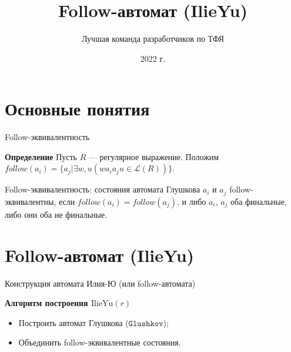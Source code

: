 \documentclass[mathserif]{beamer}
\title[] {Follow-автомат (IlieYu)}
\author[Chipollino]{Лучшая команда разработчиков по ТФЯ} %
\date[] 
{2022 г.}
\newcommand{\Lang}{\mathscr{L}} %
\def\IlieYu{\mathrm{IlieYu}}
\def\Glushkov{\mathtt{Glushkov}}
\begin{document}
\maketitle
\section{Основные понятия}
\begin{frame}{Follow-эквивалентность}
  \begin{block}{\bf Определение}
    Пусть $R$ --- регулярное выражение. Положим $follow(a_{i}) = \{a_{j} | \exists w, u(wa_{i}a_{j}u \in\Lang(R))\}$.

    Follow-эквивалентность: состояния автомата Глушкова $a_{i}$ и $a_{j}$ follow-эквивалентны, если $follow(a_{i}) = follow(a_{j})$, и либо $a_{i}$, $a_{j}$ оба финальные, либо они оба не финальные.
  \end{block} %
\end{frame}

\section{Follow-автомат (IlieYu)}
\begin{frame}{Конструкция автомата Илия-Ю (или follow-автомата)}
  \begin{block}{\bf Алгоритм построения $\IlieYu(r)$}
    \begin{itemize}
      \item Построить автомат Глушкова ($\Glushkov$);
      \item Объединить follow-эквивалентные состояния.
    \end{itemize}
  \end{block} %
\end{frame}
\end{document}
